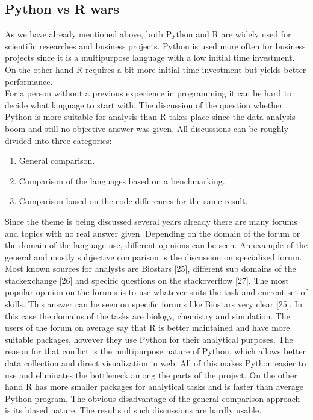 \documentclass [twoside,
  11pt, a4paper,
  footinclude=true,
  headinclude=true,
  cleardoublepage=empty
]{article}
\begin{document}
\subsection{Python vs R wars}
As we have already mentioned above, both Python and R are widely used for scientific researches and business projects. Python is used more often for business projects since it is a multipurpose language with a low initial time investment. On the other hand R requires a bit more initial time investment but yields better performance.\\
For a person without a previous experience in programming it can be hard to decide what language to start with. The discussion of the question whether Python is more suitable for analysis than R takes place since the data analysis boom and still no objective answer was given. All discussions can be roughly divided into three categories:
\begin{enumerate}
    \item General comparison.
    \item Comparison of the languages based on a benchmarking.
    \item Comparison based on the code differences for the same result.
\end{enumerate}
Since the theme is being discussed several years already there are many forums and topics with no real answer given. Depending on the domain of the forum or the domain of the language use, different opinions can be seen.
An example of the general and mostly subjective comparison is the discussion on specialized forum. Most known sources for analysts are Biostars [25], different sub domains of the stackexchange [26] and specific questions on the stackoverflow [27]. The most popular opinion on the forums is to use whatever suits the task and current set of skills. This answer can be seen on specific forums like Biostars very clear [25]. In this case the domains of the tasks are biology, chemistry and simulation. The users of the forum on average say that R is better maintained and have more suitable packages, however they use Python for their analytical purposes. The reason for that conflict is the multipurpose nature of Python, which allows better data collection and direct visualization in web. All of this makes Python easier to use and eliminates the bottleneck among the parts of the project. On the other hand R has more smaller packages for analytical tasks and is faster than average Python program. The obvious disadvantage of the general comparison approach is its biased nature. The results of such discussions are hardly usable.\\
\end{document}
